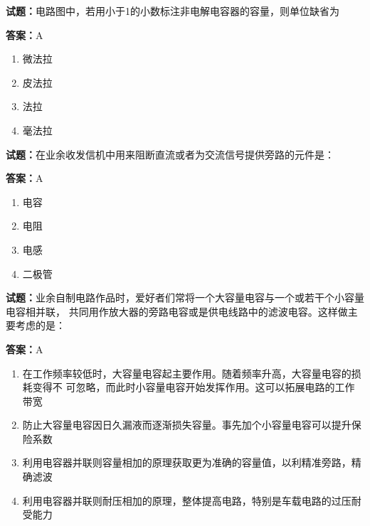 \documentclass{ctexbook}
\begin{document}


\vspace{1em}

\textbf{试题：}电路图中，若用小于1的小数标注非电解电容器的容量，则单位缺省为 

\textbf{答案：}A 

\begin{enumerate}[leftmargin=3em]
  \item 微法拉 

  \item 皮法拉 

  \item 法拉 

  \item 毫法拉 

\end{enumerate}





\vspace{1em}

\textbf{试题：}在业余收发信机中用来阻断直流或者为交流信号提供旁路的元件是： 

\textbf{答案：}A 

\begin{enumerate}[leftmargin=3em]
  \item 电容 

  \item 电阻 

  \item 电感 

  \item 二极管 

\end{enumerate}






\vspace{1em}

\textbf{试题：}业余自制电路作品时，爱好者们常将一个大容量电容与一个或若干个小容量电容相并联，
共同用作放大器的旁路电容或是供电线路中的滤波电容。这样做主要考虑的是： 

\textbf{答案：}A 

\begin{enumerate}[leftmargin=3em]
  \item 在工作频率较低时，大容量电容起主要作用。随着频率升高，大容量电容的损耗变得不
可忽略，而此时小容量电容开始发挥作用。这可以拓展电路的工作带宽 

  \item 防止大容量电容因日久漏液而逐渐损失容量。事先加个小容量电容可以提升保险系数 

  \item 利用电容器并联则容量相加的原理获取更为准确的容量值，以利精准旁路，精确滤波 

  \item 利用电容器并联则耐压相加的原理，整体提高电路，特别是车载电路的过压耐受能力 

\end{enumerate}
\end{document}
